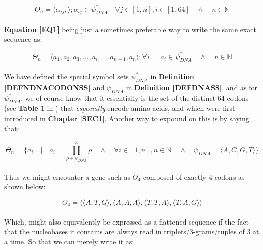 \documentclass[a4paper, 18pt]{book} %
\begin{document}
\begin{equation}
\label{EQ1}
\Theta_n = \langle \alpha_{ij}, \rangle ;
\alpha_{ij} \in \psi_{DNA}^* \quad \forall j \in [1,n],  i \in [1,64] \quad \land \quad n \in \mathbb{N}
\end{equation}\\

\textbf{\hyperref[EQ1]{Equation \ref{EQ1}}} being just a sometimes preferable way to write the same exact sequence as:
 
 
 \begin{equation}
\label{EQ2}
\Theta_n = \langle a_1,a_2,a_3,...,a_i,...,a_{n-1},a_n \rangle ;
\forall i \quad \exists a_i \in \psi_{DNA}^* \quad \land \quad n \in \mathbb{N}
\end{equation}\\

We have defined the special symbol sets $\psi_{DNA}^*$ in \textbf{\hyperref[DEFNDNACODONSS]{Definition \ref{DEFNDNACODONSS}}} and  $\psi_{DNA}$ in \textbf{\hyperref[DEFDNASS]{Definition \ref{DEFDNASS}}}, and as for $\psi_{DNA}^*$, we of course know that it essentially is the set of the distinct 64 codons (see \textbf{Table 1} in \cite{gregory1987oxford}) that \textit{especially} encode amino acids, and which were first introduced in \textbf{\hyperref[SEC1]{Chapter \ref{SEC1}}}. Another way to expound on this is by saying that:

 \begin{equation}
\label{EQ3}
\Theta_n = \{a_i \quad | \quad a_i = \prod\limits_{\rho \in \psi_{DNA}}^3 \rho \quad \land \quad \forall i \in [1,n], n \in \mathbb{N} \quad \land \quad \psi_{DNA} = \langle A, C, G, T \rangle\}
\end{equation}\\

Thus we might encounter a gene such as $\Theta_4$ composed of exactly 4 codons as shown below:

 \begin{equation}
\label{EQ4}
\Theta_4 = \langle \langle A, T, G \rangle, \langle A, A, A \rangle, \langle T, T, A \rangle, \langle T, A, G \rangle \rangle
\end{equation}\\

Which, might also equivalently be expressed as a flattened sequence if the fact that the nucleobases it contains are always read in triplets/3-grams/tuples of 3 at a time. So that we can merely write it as:\\
\end{document}
